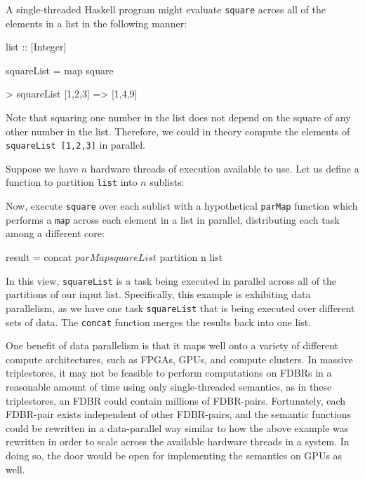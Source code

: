 \documentclass[../main.tex]{subfiles}
\begin{document}
A single-threaded Haskell program might evaluate \texttt{square} across all of the elements in a list in the following manner:

\begin{code}
	list :: [Integer]
	
	squareList = map square
	
	> squareList [1,2,3] => [1,4,9]
\end{code}

Note that squaring one number in the list does not depend on the square of any other number in the list.
Therefore, we could in theory compute the elements of \texttt{squareList [1,2,3]} in parallel.

Suppose we have $n$ hardware threads of execution available to use.  Let us define a function to partition \texttt{list} into $n$ sublists:


Now, execute \texttt{square} over each sublist with a hypothetical \texttt{parMap} function which
performs a \texttt{map} across each element in a list in parallel, distributing each task among a different core:

\begin{code}
	result = concat $ parMap squareList $ partition n list
\end{code}

In this view, \texttt{squareList} is a task being executed in parallel across all of the partitions of our input list.
Specifically, this example is exhibiting data parallelism, as we have one task \texttt{squareList} that is being executed
over different sets of data.  The \texttt{concat} function merges the results back into one list.

One benefit of data parallelism is that it maps well onto a variety of different compute architectures, such as
FPGAs, GPUs, and compute clusters.  In massive triplestores, it may not be feasible to perform computations on
FDBRs in a reasonable amount of time using only single-threaded semantics, as in these triplestores,
an FDBR could contain millions of FDBR-pairs.  Fortunately, each FDBR-pair exists independent of other FDBR-pairs, and 
the semantic functions could be rewritten in a data-parallel way similar to how the above example was rewritten
in order to scale across the available hardware threads in a system.  In doing so, the door would be open for implementing
the semantics on GPUs as well.
\end{document}
